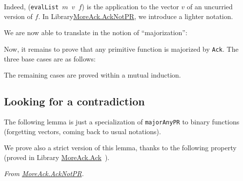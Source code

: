 

Indeed, (\texttt{evalList $m$ $v$ $f$}) is the application to the vector $v$ of
an uncurried version of $f$.
In Library\href{../theories/html/hydras.MoreAck.AckNotPR.html}{MoreAck.AckNotPR}, we introduce a lighter notation.






We are now able to translate in \gallina{} the notion of ``majorization'':





Now, it remains to prove that any primitive function is majorized by \texttt{Ack}.
The three base cases  are as follows:









The remaining cases are proved within a mutual  induction.






\subsection{Looking for a contradiction}

The following lemma is just a specialization of \texttt{majorAnyPR} to
binary functions (forgetting vectors, coming back to usual notations).



We prove also a strict version of this lemma, thanks to the following property (proved in Library
\href{../theories/html/hydras.MoreAck.Ack.html}{MoreAck.Ack}~).




\vspace{4pt}
\noindent
\emph{From \href{../theories/html/hydras.MoreAck.AckNotPR.html}{MoreAck.AckNotPR}.}






